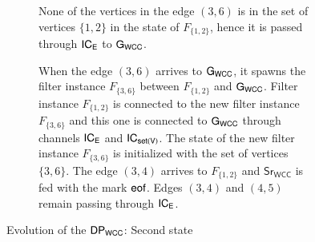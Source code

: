   \begin{figure}[h!]
  \centering
  \begin{subfigure}[b]{\textwidth}
   \centering
    \caption{None of the vertices in the edge $(3,6)$ is in the set of vertices $\{1,2\}$ in the state of $F_{\{1,2\}}$, hence it is passed through $\mathsf{IC_E}$ to $\mathsf{G_{WCC}}$.}
    \label{fig:dp_example_3_4a}
  \end{subfigure}
  \vspace{.3cm}
  
  \begin{subfigure}[b]{\textwidth}
   \centering
    \caption{When the edge $(3,6)$ arrives to $\mathsf{G_{WCC}}$, it spawns the filter instance $F_{\{3,6\}}$  between $F_{\{1,2\}}$ and $\mathsf{G_{WCC}}$. Filter instance $F_{\{1,2\}}$ is connected to the new filter instance $F_{\{3,6\}}$ and this one is connected to  $\mathsf{G_{WCC}}$ through channels $\mathsf{IC_E}$ and  $\mathsf{IC_{set(V)}}$. The state of the new filter instance $F_{\{3,6\}}$ is initialized with the set of vertices $\{3,6\}$. The edge $(3,4)$ arrives to $F_{\{1,2\}}$  and $\mathsf{Sr_{WCC}}$ is fed with the mark $\mathsf{eof}$. Edges $(3,4)$ and $(4,5)$ remain passing through $\mathsf{IC_E}$.}
    \label{fig:dp_example_3_4b}
  \end{subfigure}
  \caption[{[PoC] $\dpwcc$ Evolving second state}]{Evolution of the $\dpwcc$: Second state}
  \label{fig:dp_example_3_4}
  \end{figure}
  \vspace{.5cm}
  
